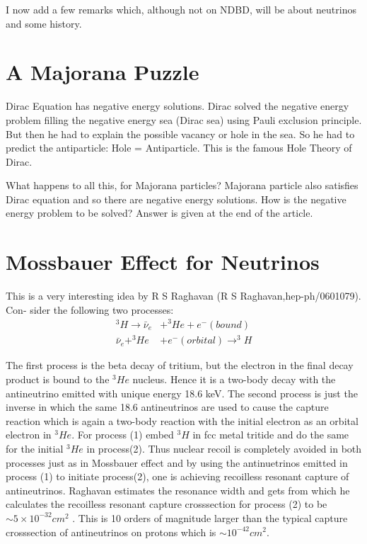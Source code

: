 I now add a few remarks which, although not on NDBD, will be about neutrinos and
some history.

\section*{A Majorana Puzzle}

Dirac Equation has negative energy solutions. Dirac solved the negative energy problem
filling the negative energy sea (Dirac sea) using Pauli exclusion principle. But then he had
to explain the possible vacancy or hole in the sea. So he had to predict the antiparticle:
Hole = Antiparticle. This is the famous Hole Theory of Dirac.

What happens to all this, for Majorana particles? Majorana particle also satisfies Dirac
equation and so there are negative energy solutions. How is the negative energy problem to
be solved? Answer is given at the end of the article.

\section*{Mossbauer Effect for Neutrinos}

This is a very interesting idea by R S Raghavan (R S Raghavan,hep-ph/0601079). Con-
sider the following two processes:
\begin{align}
^{3}H \rightarrow \bar{\nu}_{e} & + ^{3}He + e^{-}(bound)\\
\bar{\nu}_{e} +^{3}He & + e^{-}(orbital)\rightarrow^{3} H
\end{align}


The first process is the beta decay of tritium, but the electron in the final decay product
is bound to the $^{3}He$ nucleus. Hence it is a two-body decay with the antineutrino emitted
with unique energy 18.6 keV. The second process is just the inverse in which the same 18.6
antineutrinos are used to cause the capture reaction which is again a two-body reaction
with the initial electron as an orbital electron in $^{3}He$. For process (1) embed $^{3}H$ in fcc
metal tritide and do the same for the initial $^{3}He$ in process(2). Thus nuclear recoil is completely avoided in both processes just as in Mossbauer effect and by using the antinuetrinos
emitted in process (1) to initiate process(2), one is achieving recoilless resonant capture of
antineutrinos. Raghavan estimates the resonance width and gets from which he calculates the recoilless resonant capture crosssection for process (2) to be $\sim 5\times 10^{-32} cm^{2}$
. This is 10 orders of magnitude larger than the typical capture crosssection
of antineutrinos on protons which is $\sim 10^{-42} cm^{2}$.

